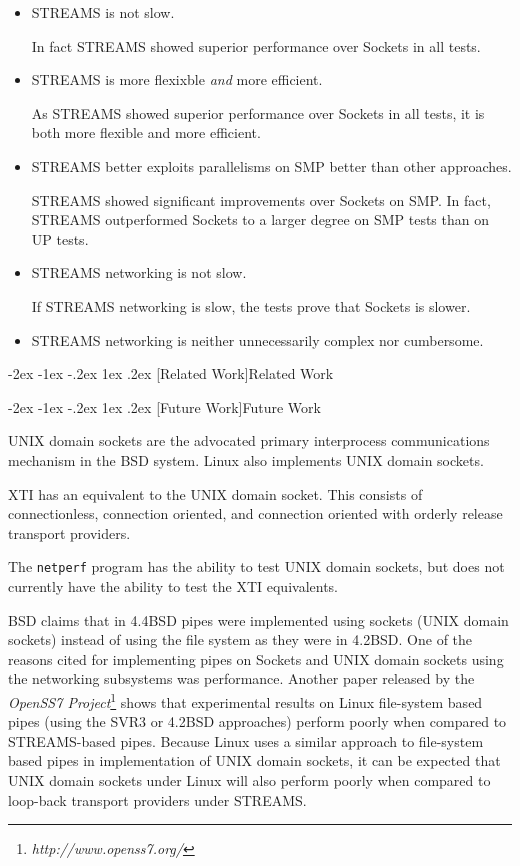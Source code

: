 \documentclass[letterpaper,final,notitlepage,twocolumn,10pt,twoside]{article}
\makeatletter
\let\large\normalsize
\let\normalsize\small
\let\small\footnotesize
\let\footnotesize\scriptsize
\let\scriptsize\tiny
\renewcommand\section{\@startsection {section}{1}{\z@}%
                                   {-2ex \@plus -1ex \@minus -.2ex}%
                                   {1ex \@plus .2ex}%
                                   {\normalfont\large\bfseries}}
\makeatother
\begin{document}
\begin{itemize}
\item STREAMS is not slow.

In fact STREAMS showed superior performance over Sockets in all tests.

\item STREAMS is more flexixble {\em and} more efficient.

As STREAMS showed superior performance over Sockets in all tests, it is both
more flexible and more efficient.

\item STREAMS better exploits parallelisms on SMP better than other approaches.

STREAMS showed significant improvements over Sockets on SMP.  In fact, STREAMS
outperformed Sockets to a larger degree on SMP tests than on UP tests.

\item STREAMS networking is not slow.

If STREAMS networking is slow, the tests prove that Sockets is slower.

\item STREAMS networking is neither unnecessarily complex nor cumbersome.

\end{itemize}

\section[Related Work]{Related Work}

\section[Future Work]{Future Work}

UNIX domain sockets are the advocated primary interprocess communications
mechanism in the BSD system.  Linux also implements UNIX domain sockets.

XTI has an equivalent to the UNIX domain socket.  This consists of
connectionless, connection oriented, and connection oriented with orderly
release transport providers.

The \texttt{netperf} program has the ability to test UNIX domain sockets, but
does not currently have the ability to test the XTI equivalents.

BSD claims that in 4.4BSD pipes were implemented using sockets (UNIX domain
sockets) instead of using the file system as they were in 4.2BSD.  One of the
reasons cited for implementing pipes on Sockets and UNIX domain sockets using
the networking subsystems was performance.  Another paper released by the
\textsl{OpenSS7 Project}\footnote{\textit{http://www.openss7.org/}} shows that
experimental results on Linux file-system based pipes (using the SVR3 or
4.2BSD approaches) perform poorly when compared to STREAMS-based pipes.
Because Linux uses a similar approach to file-system based pipes in
implementation of UNIX domain sockets, it can be expected that UNIX domain
sockets under Linux will also perform poorly when compared to loop-back
transport providers under STREAMS.
\end{document}
